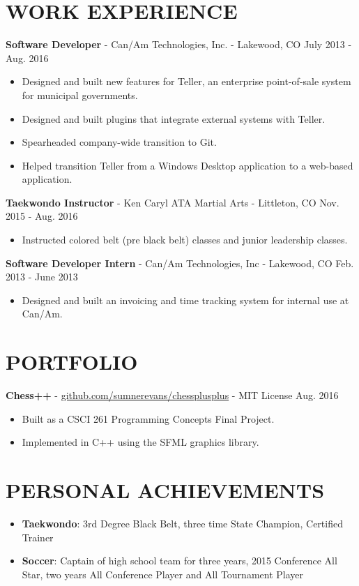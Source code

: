 \documentclass[10.5pt,letterpaper]{article}
\begin{document}
\section*{WORK EXPERIENCE}
\textbf{Software Developer} - Can/Am Technologies, Inc. - Lakewood, CO \hfill July 2013 - Aug. 2016
\begin{itemize}
    \item Designed and built new features for Teller, an enterprise point-of-sale system for
        municipal governments.
    \item Designed and built plugins that integrate external systems with Teller.
    \item Spearheaded company-wide transition to Git.
    \item Helped transition Teller from a Windows Desktop application to a web-based application.
\end{itemize}

\vspace{4pt}
\textbf{Taekwondo Instructor} - Ken Caryl ATA Martial Arts - Littleton, CO \hfill
Nov. 2015 - Aug. 2016
\begin{itemize}
    \item Instructed colored belt (pre black belt) classes and junior leadership classes.
\end{itemize}

\vspace{4pt}
\textbf{Software Developer Intern} - Can/Am Technologies, Inc - Lakewood, CO \hfill
Feb. 2013 - June 2013
\begin{itemize}
    \item Designed and built an invoicing and time tracking system for internal use at Can/Am.
\end{itemize}

\section*{PORTFOLIO}
\textbf{Chess++} -
\href{https://github.com/sumnerevans/chessplusplus}{github.com/sumnerevans/chessplusplus} - MIT
License \hfill Aug. 2016
\begin{itemize}
    \item Built as a CSCI 261 Programming Concepts Final Project.
    \item Implemented in C++ using the SFML graphics library.
\end{itemize}

\section*{PERSONAL ACHIEVEMENTS}
\begin{itemize}
    \item \textbf{Taekwondo}: 3rd Degree Black Belt, three time State Champion, Certified Trainer
    \item \textbf{Soccer}: Captain of high school team for three years, 2015 Conference All Star,
        two years All Conference Player and All Tournament Player
\end{itemize}
\end{document}
